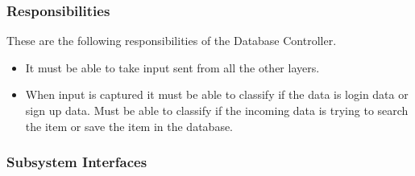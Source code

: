 \subsubsection{Responsibilities}
These are the following responsibilities of the Database Controller.
\begin{itemize}
    \item It must be able to take input sent from all the other layers.  
    \item When input is captured it must be able to classify if the data is login data or sign up data. Must be able to classify if the incoming data is trying to search the item or save the item in the database.
\end{itemize}

\subsubsection{Subsystem Interfaces}


